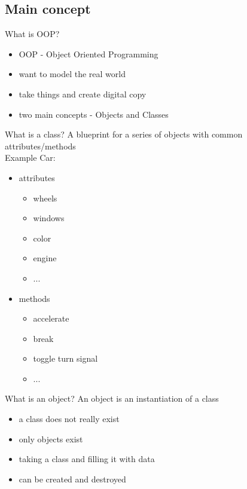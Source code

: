 	\subsection{Main concept}
	\begin{frame}[fragile]{What is OOP?}
		\begin{itemize}
			\item OOP - Object Oriented Programming
			\item want to model the real world
			\item take things and create digital copy
			\item two main concepts - Objects and Classes
		\end{itemize}	
	\end{frame}
	\begin{frame}[fragile]{What is a class?}
		A blueprint for a series of objects with common attributes/methods \\
		Example Car: \\
		\begin{itemize}
			\item<2-> attributes \\ \begin{itemize}
					\item wheels
					\item windows
					\item color
					\item engine
					\item ...
					
				\end{itemize}
			\item<3-> methods \\ 
						\begin{itemize}
							\item accelerate
							\item break
							\item toggle turn signal
							\item ...
						\end{itemize}
		\end{itemize}
		
	\end{frame}

	\begin{frame}[fragile]{What is an object?}
		An object is an instantiation of a class
		\begin{itemize}
			\item a class does not really exist
			\item only objects exist
			\item taking a class and filling it with data
			\item can be created and destroyed
		\end{itemize} 
	\end{frame}
	
